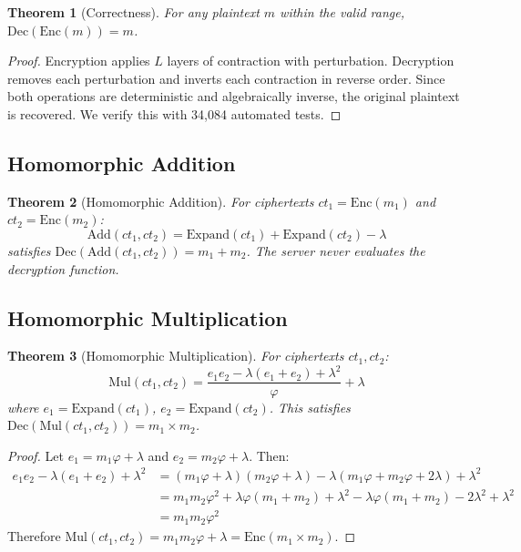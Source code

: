 \documentclass[11pt,a4paper]{article}
\newtheorem{theorem}{Theorem}[section]
\begin{document}
\begin{theorem}[Correctness]
For any plaintext $m$ within the valid range, $\text{Dec}(\text{Enc}(m)) = m$.
\end{theorem}

\begin{proof}
Encryption applies $L$ layers of contraction with perturbation. Decryption removes each perturbation and inverts each contraction in reverse order. Since both operations are deterministic and algebraically inverse, the original plaintext is recovered. We verify this with 34,084 automated tests.
\end{proof}

\subsection{Homomorphic Addition}

\begin{theorem}[Homomorphic Addition]
For ciphertexts $ct_1 = \text{Enc}(m_1)$ and $ct_2 = \text{Enc}(m_2)$:
\begin{equation}
    \text{Add}(ct_1, ct_2) = \text{Expand}(ct_1) + \text{Expand}(ct_2) - \lambda
\end{equation}
satisfies $\text{Dec}(\text{Add}(ct_1, ct_2)) = m_1 + m_2$. The server never evaluates the decryption function.
\end{theorem}

\subsection{Homomorphic Multiplication}

\begin{theorem}[Homomorphic Multiplication]
For ciphertexts $ct_1, ct_2$:
\begin{equation}
    \text{Mul}(ct_1, ct_2) = \frac{e_1 e_2 - \lambda(e_1 + e_2) + \lambda^2}{\varphi} + \lambda
\end{equation}
where $e_1 = \text{Expand}(ct_1)$, $e_2 = \text{Expand}(ct_2)$. This satisfies $\text{Dec}(\text{Mul}(ct_1, ct_2)) = m_1 \times m_2$.
\end{theorem}

\begin{proof}
Let $e_1 = m_1 \varphi + \lambda$ and $e_2 = m_2 \varphi + \lambda$. Then:
\begin{align}
    e_1 e_2 - \lambda(e_1 + e_2) + \lambda^2 &= (m_1 \varphi + \lambda)(m_2 \varphi + \lambda) - \lambda(m_1 \varphi + m_2 \varphi + 2\lambda) + \lambda^2 \\
    &= m_1 m_2 \varphi^2 + \lambda\varphi(m_1 + m_2) + \lambda^2 - \lambda\varphi(m_1 + m_2) - 2\lambda^2 + \lambda^2 \\
    &= m_1 m_2 \varphi^2
\end{align}
Therefore $\text{Mul}(ct_1, ct_2) = m_1 m_2 \varphi + \lambda = \text{Enc}(m_1 \times m_2)$.
\end{proof}
\end{document}

